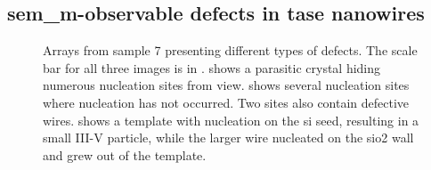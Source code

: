 \subsection{\texorpdfstring{\acs{sem_m}-observable defects in \acs{tase} nanowires}{SEM observable defects in TASE nanowires}}

\begin{figure}
    \centering
    \caption[Arrays from sample 7 presenting different types of defects.]{Arrays from sample 7 presenting different types of defects. The scale bar for all three images is in .  shows a parasitic crystal hiding numerous nucleation sites from view.  shows several nucleation sites where nucleation has not occurred. Two sites also contain defective wires.  shows a template with nucleation on the \acs{si} seed, resulting in a small III-V particle, while the larger wire nucleated on the \acs{sio2} wall and grew out of the template.}
    \label{fig:defects}
\end{figure}

